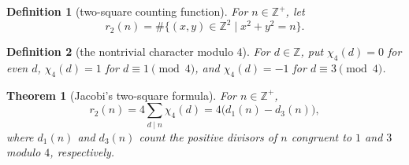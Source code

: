 \documentclass[11pt]{article}
\theoremstyle{ntstyle}
\newtheorem{theorem}{Theorem}[subsection]
\newtheorem{definition}{Definition}[subsection]
\begin{document}
\begin{definition}[two-square counting function]\label{def:8.3.1}
	For $n\in\mathbb{Z}^+$, let
	\[
		r_2(n)=\#\{(x,y)\in\mathbb{Z}^2 \mid x^2+y^2=n\}.
	\]
\end{definition}
\begin{definition}[the nontrivial character modulo $4$]\label{def:8.3.2} For $d\in\mathbb{Z}$, put $\chi_4(d)=0$ for even $d$, $\chi_4(d)=1$ for
	$d\equiv1\pmod{4}$, and $\chi_4(d)=-1$ for $d\equiv3\pmod{4}$.
\end{definition}
\begin{theorem}[Jacobi's two-square formula]\label{thm:8.3.1} For
	$n\in\mathbb{Z}^+$,
	\[
		r_2(n)=4\sum_{d\mid n}\chi_4(d)=4\big(d_1(n)-d_3(n)\big),
	\]
	where $d_1(n)$ and $d_3(n)$ count the positive divisors of $n$
	congruent to $1$ and $3$ modulo $4$, respectively.
\end{theorem}
\end{document}
